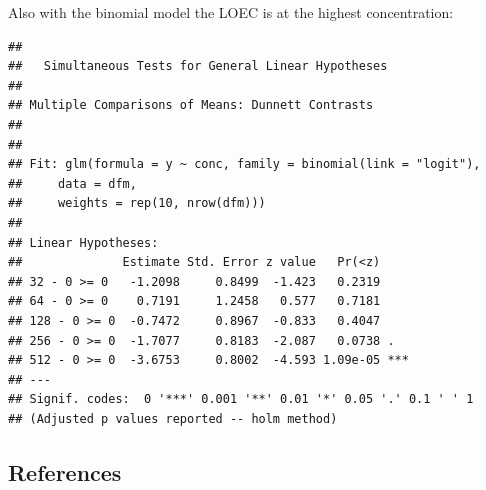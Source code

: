 Also with the binomial model the LOEC is at the highest concentration:
\begin{knitrout}
\color{fgcolor}\small\begin{kframe}
\begin{alltt}
\hlstd{(}  \hlstd{=} \hlstd{(} \hlstd{=} \hlstd{),} 
                     \hlstd{=} \hlstd{),}
                     \hlstd{=} \hlstd{(}\hlstd{))}
\end{alltt}
\begin{verbatim}
## 
## 	 Simultaneous Tests for General Linear Hypotheses
## 
## Multiple Comparisons of Means: Dunnett Contrasts
## 
## 
## Fit: glm(formula = y ~ conc, family = binomial(link = "logit"), 
##     data = dfm, 
##     weights = rep(10, nrow(dfm)))
## 
## Linear Hypotheses:
##              Estimate Std. Error z value   Pr(<z)    
## 32 - 0 >= 0   -1.2098     0.8499  -1.423   0.2319    
## 64 - 0 >= 0    0.7191     1.2458   0.577   0.7181    
## 128 - 0 >= 0  -0.7472     0.8967  -0.833   0.4047    
## 256 - 0 >= 0  -1.7077     0.8183  -2.087   0.0738 .  
## 512 - 0 >= 0  -3.6753     0.8002  -4.593 1.09e-05 ***
## ---
## Signif. codes:  0 '***' 0.001 '**' 0.01 '*' 0.05 '.' 0.1 ' ' 1
## (Adjusted p values reported -- holm method)
\end{verbatim}
\end{kframe}
\end{knitrout}



\subsection*{References}
\printbibliography[heading=none]

